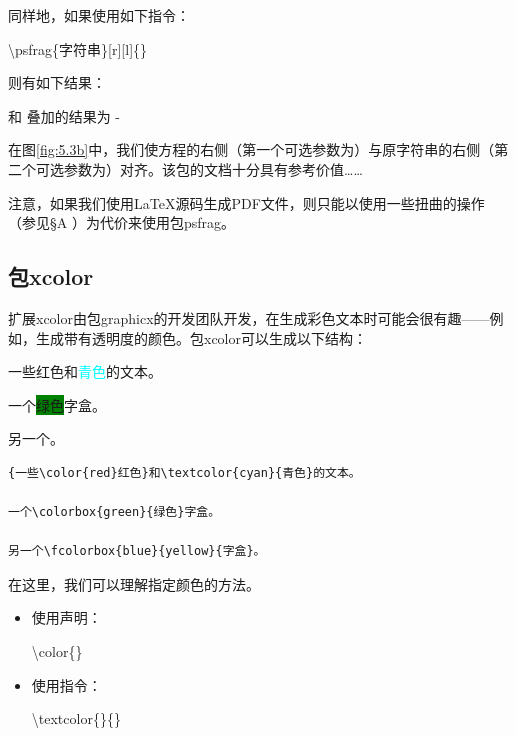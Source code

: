 同样地，如果使用如下指令：

\begin{dmd}
  \backslash psfrag\{字符串\}[r][l]\{\}
\end{dmd}

则有如下结果：

\begin{center}
  \quad 和\quad
   \quad 叠加的结果为 \quad
  \kern-\fboxrule%
\end{center}

在图\ref{fig:5.3b}中，我们使方程的右侧（第一个可选参数为）与原字符串的右侧（第二个可选参数为）对齐。该包的文档十分具有参考价值……

\begin{exclamation}
注意，如果我们使用\LaTeX 源码生成PDF文件，则只能以使用一些扭曲的操作（参见\S A%
）为代价来使用包\textsf{psfrag}。
\end{exclamation}

\subsection{包\textsf{xcolor}}

扩展\textsf{xcolor}由包\textsf{graphicx}的开发团队开发，在生成彩色文本时可能会很有趣——例如，生成带有透明度的颜色。包\textsf{xcolor}可以生成以下结构：

\begin{codelist}[5.6]{
  {一些\color{red}红色}和\textcolor{cyan}{青色}的文本。

  一个\colorbox{green}{绿色}字盒。
  
  另一个。
}\begin{verbatim}
{一些\color{red}红色}和\textcolor{cyan}{青色}的文本。

一个\colorbox{green}{绿色}字盒。

另一个\fcolorbox{blue}{yellow}{字盒}。
\end{verbatim}
\end{codelist}

在这里，我们可以理解指定颜色的方法。

\begin{itemize}
  \item 使用声明：
  
  \begin{dmd}
    \backslash color\{\}
  \end{dmd}

  \item 使用指令：

  \begin{dmd}
  \backslash textcolor\{\}\{\}
  \end{dmd}
\end{itemize}


